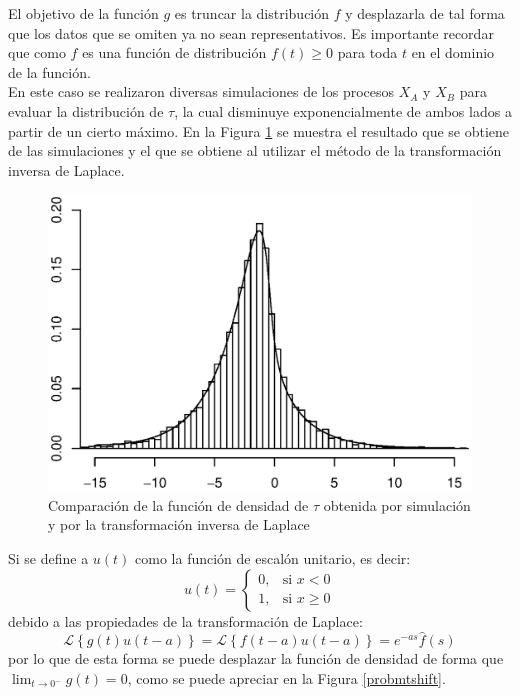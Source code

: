 \documentclass[11pt]{article}
\numberwithin{equation}{section} %
\begin{document}
El objetivo de la función $g$ es truncar la distribución $f$ y desplazarla de tal forma que los datos que se omiten ya no sean representativos. Es importante recordar que como $f$ es una función de distribución $f(t)\geq 0$ para toda $t$ en el dominio de la función.\\

En este caso se realizaron diversas simulaciones de los procesos $X_A$ y $X_B$ para evaluar la distribución de $\tau$, la cual disminuye exponencialmente de ambos lados a partir de un cierto máximo. En la Figura \ref{probmt} se muestra el resultado que se obtiene de las simulaciones y el que se obtiene al utilizar el método de la transformación inversa de Laplace.\\

\begin{figure}[htbp] \centering
\includegraphics[scale=0.75,trim=0 1cm 0 1cm]{probpm.eps}
\caption{Comparación de la función de densidad de $\tau$ obtenida por simulación y por la transformación inversa de Laplace}
\label{probmt}
\end{figure}

Si se define a $u(t)$ como la función de escalón unitario, es decir:
\[
u(t) =
\begin{cases}
0, & \mbox{si } x<0 \\
1, & \mbox{si } x\geq0
\end{cases}
\]
debido a las propiedades de la transformación de Laplace:
\[
\mathcal{L} \left\{g(t)u(t-a)\right\}=\mathcal{L} \left\{f(t-a)u(t-a)\right\}=e^{-as}\hat{f}(s)
\]
por lo que de esta forma se puede desplazar la función de densidad de forma que $\lim_{t\to 0^-} g(t)=0$, como se puede apreciar en la Figura \ref{probmtshift}.\\
\end{document}
